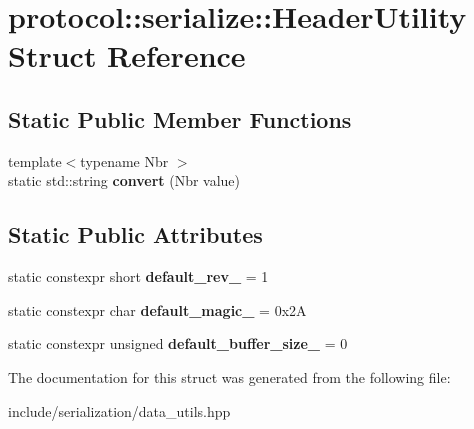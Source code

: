 \hypertarget{structprotocol_1_1serialize_1_1_header_utility}{}\section{protocol\+:\+:serialize\+:\+:Header\+Utility Struct Reference}
\label{structprotocol_1_1serialize_1_1_header_utility}
\subsection*{Static Public Member Functions}
\begin{DoxyCompactItemize}
\item 
\mbox{\label{structprotocol_1_1serialize_1_1_header_utility_a89a8aa68755a01c37a3f25157583ce2c}} 
{\footnotesize template$<$typename Nbr $>$ }\\static std\+::string {\bfseries convert} (Nbr value)
\end{DoxyCompactItemize}
\subsection*{Static Public Attributes}
\begin{DoxyCompactItemize}
\item 
\mbox{\label{structprotocol_1_1serialize_1_1_header_utility_a82c3fca4514ea53ebe3b30eec3b2ea5f}} 
static constexpr short {\bfseries default\+\_\+rev\+\_\+} = 1
\item 
\mbox{\label{structprotocol_1_1serialize_1_1_header_utility_afb50d080d29105da6890bee9e56d90e8}} 
static constexpr char {\bfseries default\+\_\+magic\+\_\+} = 0x2A
\item 
\mbox{\label{structprotocol_1_1serialize_1_1_header_utility_a8998465a1f45d39dfb4fdc982187f4d4}} 
static constexpr unsigned {\bfseries default\+\_\+buffer\+\_\+size\+\_\+} = 0
\end{DoxyCompactItemize}


The documentation for this struct was generated from the following file\+:\begin{DoxyCompactItemize}
\item 
include/serialization/data\+\_\+utils.\+hpp\end{DoxyCompactItemize}
